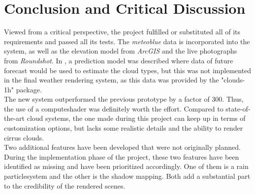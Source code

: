 \section{Conclusion and Critical Discussion}
\label{section:conclusion}
Viewed from a critical perspective, the project fulfilled or substituted all of its requirements and passed all its tests.
The \emph{meteoblue} data is incorporated into the system, as well as the elevation model from \emph{ArcGIS} and the live photographs from \emph{Roundshot}.
In , a prediction model was described where data of future forecast would be used to estimate the cloud types, but this was not implemented in the final weather rendering system, as this data was provided by the "clouds-1h" package.
\\
The new system outperformed the previous prototype by a factor of 300. Thus, the use of a \gls{computeshader} was definitely worth the effort.
Compared to state-of-the-art cloud systems, the one made during this project can keep up in terms of customization options, but lacks some realistic details and the ability to render cirrus clouds.
\\
Two additional features have been developed that were not originally planned. 
During the implementation phase of the project, these two features have been identified as missing and have been prioritized accordingly.
One of them is a rain \gls{particlesystem} and the other is the shadow mapping.
Both add a substantial part to the credibility of the rendered scenes.